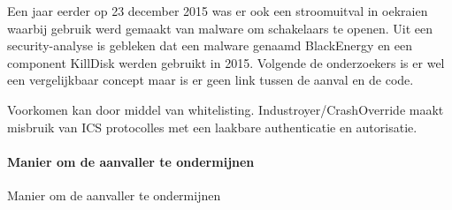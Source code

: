 {Een jaar eerder op 23 december 2015 was er ook een stroomuitval in oekraien waarbij gebruik werd
gemaakt van malware om schakelaars te openen. Uit een security-analyse is gebleken dat een
malware genaamd BlackEnergy en een component KillDisk werden gebruikt in 2015. Volgende de
onderzoekers is er wel een vergelijkbaar concept maar is er geen link tussen de aanval en de code.

Voorkomen kan door middel van whitelisting.
Industroyer/CrashOverride maakt misbruik van ICS protocolles met een laakbare authenticatie en
autorisatie.


\paragraph{Manier om de aanvaller te ondermijnen}
Manier om de aanvaller te ondermijnen

}
